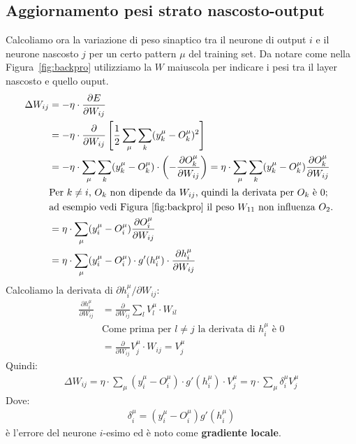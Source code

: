 \newpage

\subsection{Aggiornamento pesi strato nascosto-output} %
\label{sub:aggiornamento_pesi_strato_nascosto_output}

Calcoliamo ora la variazione di peso sinaptico tra il neurone di output $i$ e il neurone nascosto $j$ per un certo pattern $\mu$ del training set. Da notare come nella Figura~\ref{fig:backpro} utilizziamo la $W$ maiuscola per indicare i pesi tra il layer nascosto e quello ouput.
\begin{align*}
    \Delta W_{ij} &= - \eta \cdot \frac{\partial E}{\partial W_{ij}} \\
    &= - \eta \cdot \frac{\partial}{\partial W_{ij}}\left[\frac{1}{2} \sum_\mu \sum_k (y_k^\mu - O_k^\mu)^2 \right]\\
    &= - \eta \cdot \sum_\mu \sum_k (y_k^\mu -O_k^\mu) \cdot \left( -  \frac{\partial O_k^\mu} {\partial W_{ij}} \right) = \eta \cdot \sum_\mu \sum_k (y_k^\mu -O_k^\mu) \frac{\partial O_k^\mu}{\partial W_{ij}} \\
    &\text{Per $k\neq i$, $O_k$ non dipende da $W_{ij}$, quindi la derivata per $O_k$ è 0;} \\
    &\text{ad esempio vedi Figura~\ref{fig:backpro} il peso $W_{11}$ non influenza $O_2$. } \\
    &= \eta \cdot \sum_\mu  (y_i^\mu - O_i^\mu) \frac{\partial O_i^\mu}{\partial W_{ij}} \\
    &= \eta \cdot \sum_\mu  (y_i^\mu - O_i^\mu) \cdot g'(h_i^\mu) \cdot \frac{\partial h_i^\mu}{\partial{W_{ij}}}
\end{align*}
Calcoliamo la derivata di $\partial h_i^\mu / \partial W_{ij}$:
\begin{align*}
    \frac{\partial h_i^\mu}{\partial{W_{ij}}} &= \frac{\partial}{\partial{W_{ij}}} \sum_l V_l^\mu \cdot W_{il} \\
    & \text{Come prima per $l\neq j$ la derivata di $h^\mu_i$ è 0} \\
    &= \frac{\partial}{\partial{W_{ij}}} V_j^\mu \cdot W_{ij} = V_j^\mu
\end{align*}
Quindi:
\begin{align*}
    \Delta W_{ij} = \eta \cdot \sum_\mu  (y_i^\mu - O_i^\mu) \cdot g'(h_i^\mu) \cdot V_j^\mu = \eta \cdot \sum_\mu \delta^\mu_i V^\mu_j
\end{align*}
Dove:
\begin{align*}
    \delta^\mu_i = (y^\mu_i - O^\mu_i) g'(h^\mu_i)
\end{align*}
è l'errore del neurone $i$-esimo ed è noto come \textbf{gradiente locale}.
\newpage

